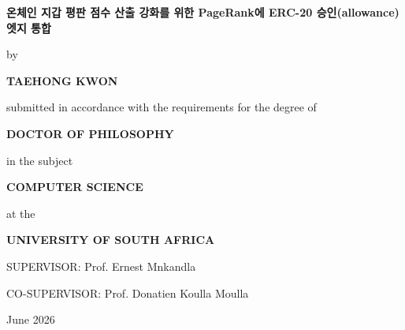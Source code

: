 \begin{titlepage}
\centering
\vspace*{0.4cm}
{\Large\bfseries 온체인 지갑 평판 점수 산출 강화를 위한 PageRank에 ERC-20 승인(allowance) 엣지 통합\par}
\vfill
{by\par}
\vspace{0.7cm}
{\large\bfseries TAEHONG KWON\par}
\vfill
{submitted in accordance with the requirements for the degree of\par}
\vspace{0.7cm}
{\large\bfseries DOCTOR OF PHILOSOPHY\par}
\vspace{0.35cm}
{in the subject\par}
\vspace{0.7cm}
{\large\bfseries COMPUTER SCIENCE\par}
\vfill
{at the\par}
\vspace{0.7cm}
{\large\bfseries UNIVERSITY OF SOUTH AFRICA\par}
\vfill
{SUPERVISOR: Prof. Ernest Mnkandla\par}
\vspace{0.35cm}
{CO-SUPERVISOR: Prof. Donatien Koulla Moulla\par}
\vfill
{June 2026\par}
\end{titlepage}
\restoregeometry
